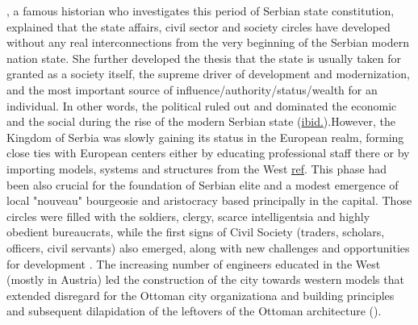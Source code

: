 \documentclass[11pt]{report}
\begin{document}
\href{Stojanovic}{\cite{stojanovic_ulje_2010}}, a famous historian who investigates this period of Serbian state constitution, explained that the state affairs, civil sector and society circles have developed without any real interconnections from the very beginning of the Serbian modern nation state. She further developed the thesis that the state is usually taken for granted as a society itself, the supreme driver of development and modernization, and the most important source of influence/authority/status/wealth for an individual. In other words, the political ruled out and dominated the economic and the social during the rise of the modern Serbian state (\href{Stojanovic}{ibid.}).\footnotemark However, the Kingdom of Serbia was slowly gaining its status in the European realm, forming close ties with European centers either by educating professional staff there or by importing models, systems and structures from the West \href{ref}{ref}. This phase had been also crucial for the foundation of Serbian elite and a modest emergence of local "nouveau" bourgeosie and aristocracy based principally in the capital.
Those circles were filled with the soldiers, clergy, scarce intelligentsia and highly obedient bureaucrats, while the  first  signs  of  Civil  Society (traders, scholars, officers, civil servants) also emerged, along with new challenges and  opportunities  for  development \href{ref}{\citealt{vukmirovic_city_2013}}.
The increasing number of engineers educated in the West (mostly in 
Austria) led the construction of the city towards western models that extended disregard for the Ottoman city organizationa and building principles and subsequent dilapidation of the leftovers of the Ottoman architecture (\href{ref}{\citealt{blagojevic_urban_2009}}).
\\
\end{document}
